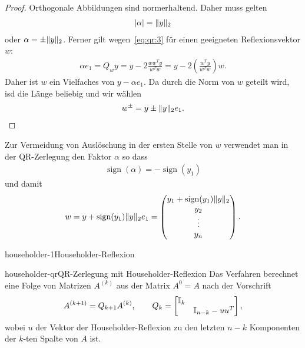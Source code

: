 \begin{proof}
  Orthogonale Abbildungen sind normerhaltend. Daher muss gelten
  \begin{gather}
    \lvert\alpha\rvert = \lVert y\rVert_2
  \end{gather}
  oder $\alpha = \pm\lVert y\rVert_2$.  Ferner gilt
  wegen~\eqref{eq:qr:3} für einen geeigneten Reflexionsvektor $w$:
  \begin{gather}
    \alpha e_1 = Q_{w} y = y-2 \frac{ww^Ty}{w^Tw}
    = y-2\left(\frac{w^Ty}{w^Tw}\right)w.
  \end{gather}
  Daher ist $w$ ein Vielfaches von $y - \alpha e_1$. Da durch die Norm
  von $w$ geteilt wird, isd die Länge beliebig und wir wählen
  \begin{gather}
    w^{\pm} = y\pm \lVert y\rVert_2 e_1.
  \end{gather}
\end{proof}

\begin{remark}
  Zur Vermeidung von Auslöschung in der ersten Stelle von $w$
  verwendet man in der QR-Zerlegung den Faktor $\alpha$ so dass
  \begin{gather}
    \operatorname{sign} (\alpha) = -\operatorname{sign} (y_1)
  \end{gather}
  und damit
  \begin{gather}
    w = y + \operatorname{sign} (y_1) \lVert y\rVert_2 e_1
    =
    \begin{pmatrix}
      y_1 + \operatorname{sign} (y_1) \lVert y\rVert_2\\
      y_2\\\vdots\\y_n
    \end{pmatrix}.
  \end{gather}
\end{remark}

\begin{Algorithmus*}{householder-1}{Householder-Reflexion}
  
\end{Algorithmus*}

\begin{Definition*}{householder-qr}{QR-Zerlegung mit Householder-Reflexion}
  Das Verfahren berechnet eine Folge von Matrizen $A^{(k)}$ aus der
  Matrix $A^{0} = A$ nach der Vorschrift
  \begin{gather}
    A^{(k+1)} = Q_{k+1} A^{(k)}, \qquad Q_k =
    \begin{bmatrix}
      \mathbb I_k\\& \mathbb I_{n-k}-uu^T
    \end{bmatrix},
  \end{gather}
  wobei $u$ der Vektor der Householder-Reflexion zu den letzten $n-k$
  Komponenten der $k$-ten Spalte von $A$ ist.
\end{Definition*}

